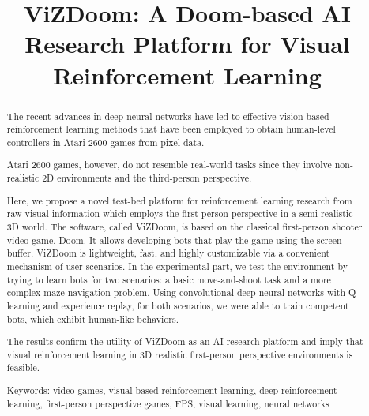 \documentclass[english,american,conference, balance]{IEEEtran}
\begin{document}
\title{ViZDoom: A Doom-based AI Research Platform for Visual Reinforcement
Learning}

\author{}
\maketitle
\begin{abstract}
\begin{comment}
Why do we care?
\end{comment}
The recent advances in deep neural networks have led to effective
vision-based reinforcement learning methods that have been employed
to obtain human-level controllers in Atari 2600 games from pixel data.
\begin{comment}
What problem are we trying to solve?
\end{comment}
Atari 2600 games, however, do not resemble real-world tasks since
they involve non-realistic 2D environments and the third-person perspective.
\begin{comment}
How did we go about solving the problem?
\end{comment}
\begin{comment}
What's the answer?
\end{comment}
Here, we propose a novel test-bed platform for reinforcement learning
research from raw visual information which employs the first-person
perspective in a semi-realistic 3D world. The software, called ViZDoom,
is based on the classical first-person shooter video game, Doom. It
allows developing bots that play the game using the screen buffer.
ViZDoom is lightweight, fast, and highly customizable via a convenient
mechanism of user scenarios. In the experimental part, we test the
environment by trying to learn bots for two scenarios: a basic move-and-shoot
task and a more complex maze-navigation problem. Using convolutional
deep neural networks with Q-learning and experience replay, for both
scenarios, we were able to train competent bots, which exhibit human-like
behaviors.\begin{comment}
What are the implications of our answer?
\end{comment}
{} The results confirm the utility of ViZDoom as an AI research platform
and imply that visual reinforcement learning in 3D realistic first-person
perspective environments is feasible.

Keywords: video games, visual-based reinforcement learning, deep reinforcement
learning, first-person perspective games, FPS, visual learning, neural
networks
\end{abstract}
\end{document}
